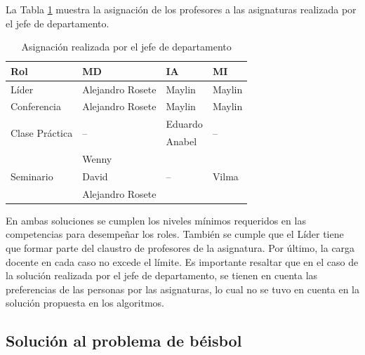 La Tabla \ref{table:asignacion-jefe-departamento} muestra la asignación de los profesores a las asignaturas realizada por el jefe de departamento.

 \begin{table}[H]
 	\centering
 	\caption{Asignación realizada por el jefe de departamento} \label{table:asignacion-jefe-departamento}
 	\begin{tabular}{l p{3.3cm} l l}
 		\toprule
 		\textbf{Rol}                      & \textbf{MD}           & \textbf{IA}           & \textbf{MI}              \\ \midrule
 		Líder                             & Alejandro Rosete      & Maylin                & Maylin                   \\ \hline
 		Conferencia                       & Alejandro Rosete      & Maylin                & Maylin                   \\ \hline
 		\multirow{2}{3cm}{Clase Práctica} & \multirow{2}{2cm}{--} & Eduardo               & \multirow{2}{2cm}{--}    \\
 		                                  &                       & Anabel                &  \\ \hline
 		\multirow{3}{2cm}{Seminario}      & Wenny                 & \multirow{3}{2cm}{--} & \multirow{3}{2cm}{Vilma} \\
 		                                  & David                 &                       &  \\
 		                                  & Alejandro Rosete      &                       &  \\ \bottomrule
 	\end{tabular}
 \end{table}
  
En ambas soluciones se cumplen los niveles mínimos requeridos en las competencias para desempeñar  los roles. También se cumple que el Líder tiene que formar parte del claustro de profesores de la asignatura. Por último, la carga docente en cada caso no excede el límite. Es importante resaltar que en el caso de la solución realizada por el jefe de departamento, se tienen en cuenta las preferencias de las personas por las asignaturas, lo cual no se tuvo en cuenta en la solución propuesta en los algoritmos.
 
\subsection{Solución al problema de  béisbol}

